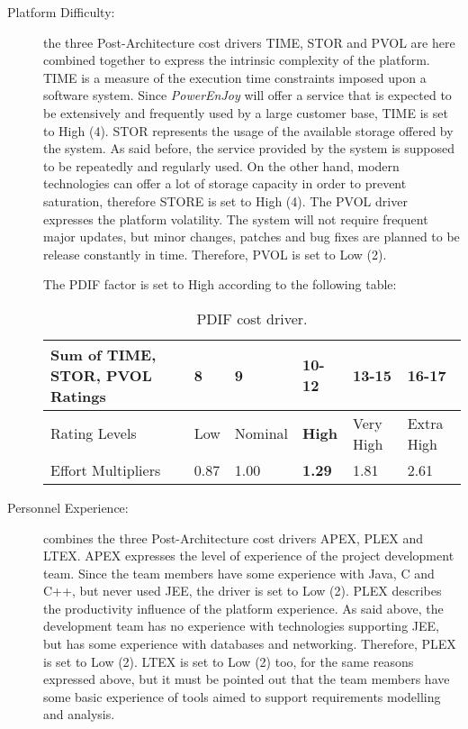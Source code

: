 \begin{description}
\item[Platform Difficulty:] the three Post-Architecture cost drivers TIME, STOR and PVOL are here combined together to express the intrinsic complexity of the platform. TIME is a measure of the execution time constraints imposed upon a software system. Since \emph{PowerEnJoy} will offer a service that is expected to be extensively and frequently used by a large customer base, TIME is set to High (4). STOR represents the usage of the available storage offered by the system. As said before, the service provided by the system is supposed to be repeatedly and regularly used. On the other hand, modern technologies can offer a lot of storage capacity in order to prevent saturation, therefore STORE is set to High (4). The PVOL driver expresses the platform volatility. The system will not require frequent major updates, but minor changes, patches and bug fixes are planned to be release constantly in time. Therefore, PVOL is set to Low (2).

The PDIF factor is set to High according to the following table:

\begin{table}[H]
	\begin{adjustwidth}{-.5in}{-.5in}
    \centering
    \begin{tabular}{p{4cm}|p{1cm}|p{1.5cm}|p{1.2cm}|p{1cm}|p{1cm}}
        \hline
        Sum of TIME, STOR, PVOL Ratings & 8 & 9 & \textbf{10-12} & 13-15 & 16-17 \\
        \hline
        \hline
        Rating Levels & Low & Nominal & \textbf{High} & Very High & Extra High \\
        \hline
        Effort Multipliers & 0.87 & 1.00 & \textbf{1.29} & 1.81 & 2.61 \\
        \hline
    \end{tabular}
    \caption{PDIF cost driver.}
    \end{adjustwidth}
\end{table}

\item[Personnel Experience:] combines the three Post-Architecture cost drivers APEX, PLEX and LTEX. APEX expresses the level of experience of the project development team. Since the team members have some experience with Java, C and C++, but never used JEE, the driver is set to Low (2). PLEX describes the productivity influence of the platform experience. As said above, the development team has no experience with technologies supporting JEE, but has some experience with databases and networking. Therefore, PLEX is set to Low (2). LTEX is set to Low (2) too, for the same reasons expressed above, but it must be pointed out that the team members have some basic experience of tools aimed to support requirements modelling and analysis.


\end{description}
